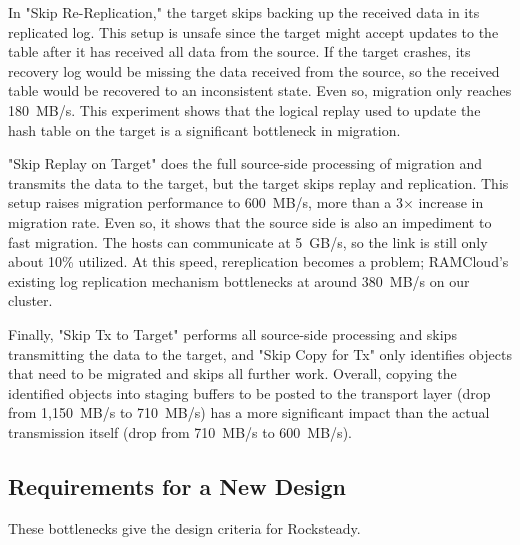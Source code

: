 In "Skip Re-Replication," the target skips backing up the
received data in its replicated log. This setup is unsafe since the target might accept
updates to the table after it has received all data from the source. If the
target crashes, its recovery log would be missing the data received from the
source, so the received table would be recovered to an inconsistent state.
Even so, migration only reaches 180~MB/s. This experiment shows that the
logical replay used to update the hash table on the target is a
significant
bottleneck in migration.

"Skip Replay on Target" does the full source-side processing of migration and
transmits the data to the target, but the target skips replay and replication.
This setup raises migration performance
to 600~MB/s, more than a 3$\times$ increase in migration
rate. Even so, it shows that the source side is also an impediment to fast
migration. The hosts can communicate at 5~GB/s, so the link is still only
about 10\% utilized. At this speed, rereplication becomes a
problem; RAMCloud's existing log replication mechanism bottlenecks at around
380~MB/s on our cluster.

Finally, "Skip Tx to Target" performs all source-side processing and skips
transmitting the data to the target, and "Skip Copy for Tx" only identifies
objects that need to be migrated and skips all further work. Overall, copying
the identified objects into staging buffers to be posted to the
transport layer (drop
from 1,150~MB/s to 710~MB/s) has a more significant impact than the
actual transmission
itself (drop from 710~MB/s to 600~MB/s).

\subsection{Requirements for a New Design}

These bottlenecks give the design criteria for Rocksteady.

